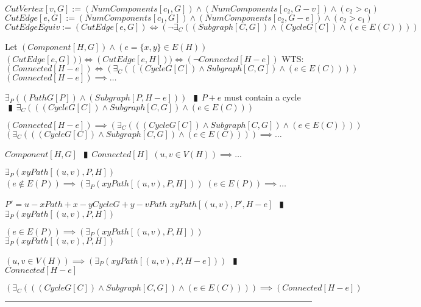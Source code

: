 \documentclass{book}
\newcommand{\abr}{:=}
\newcommand{\pipe}{$\phantom{(}\vrectangleblack\phantom{)}$}
\newcommand{\utup}[1]{\{#1\}}
\begin{document}
$CutVertex[v, G] \abr (NumComponents[c_1, G]) \land (NumComponents[c_2, G - v]) \land (c_2 > c_1)$ \\
$CutEdge[e, G] \abr (NumComponents[c_1, G]) \land (NumComponents[c_2, G - e]) \land (c_2 > c_1)$ \\
$CutEdgeEquiv \abr (CutEdge[e, G]) \iff (\lnot \exists_{C}((Subgraph[C, G]) \land (CycleG[C]) \land (e \in E(C))))$
\begin{enumerate}
  \lit Let $(Component[H, G]) \land (e = \utup{x, y} \in E(H))$
  \lit $(CutEdge[e, G])) \iff (CutEdge[e, H])) \iff (\lnot Connected[H - e])$
  \lit WTS: $(Connected[H - e]) \iff (\exists_{C}(((CycleG[C]) \land Subgraph[C, G]) \land (e \in E(C))))$
  \lit $(Connected[H - e]) \implies \ldots$
  \begin{enumerate}
    \lit $\exists_{P}((PathG[P]) \land (Subgraph[P, H - e]))$ \pipe $P + e$ must contain a cycle \pipe $\exists_{C}(((CycleG[C]) \land Subgraph[C, G]) \land (e \in E(C)))$
  \end{enumerate}
  \lit $(Connected[H - e]) \implies (\exists_{C}(((CycleG[C]) \land Subgraph[C, G]) \land (e \in E(C))))$
  \lit $(\exists_{C}(((CycleG[C]) \land Subgraph[C, G]) \land (e \in E(C)))) \implies \ldots$
  \begin{enumerate}
    \lit $Component[H, G]$ \pipe $Connected[H]$
    \lit $(u, v \in V(H)) \implies \ldots$
    \begin{enumerate}
      \lit $\exists_{P}(xyPath[(u, v), P, H])$
      \lit $(e \notin E(P)) \implies (\exists_{P}(xyPath[(u, v), P, H]))$
      \lit $(e \in E(P)) \implies \ldots$
      \begin{enumerate}
        \lit $P' = u-x Path + x-y CycleG + y-v Path$
        \lit $xyPath[(u, v), P', H - e]$ \pipe $\exists_{P}(xyPath[(u, v), P, H])$
      \end{enumerate}
      \lit $(e \in E(P)) \implies (\exists_{P}(xyPath[(u, v), P, H]))$
      \lit $\exists_{P}(xyPath[(u, v), P, H])$
    \end{enumerate}
    \lit $(u, v \in V(H)) \implies (\exists_{P}(xyPath[(u, v), P, H - e]))$ \pipe $Connected[H - e]$
  \end{enumerate}
  \lit $(\exists_{C}(((CycleG[C]) \land Subgraph[C, G]) \land (e \in E(C)))) \implies (Connected[H - e])$
\end{enumerate} \vspace{.75mm} \hrule \vspace{.75mm} \ \\ 
\end{document}
